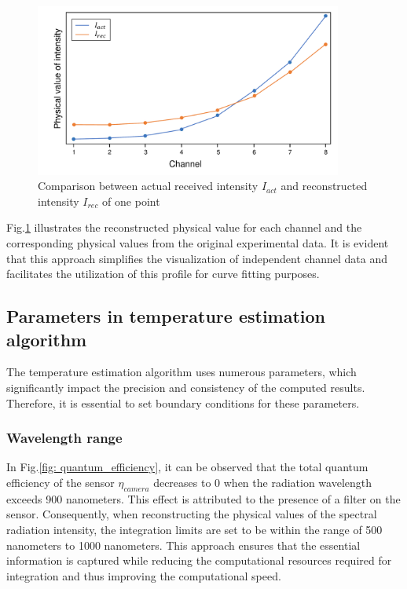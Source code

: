 \begin{figure}[htbp]
  \centering
  \includegraphics[width=0.9\textwidth]{figures/curve_fit.pdf}
  \caption{Comparison between actual received intensity $I_{act}$ 
  and reconstructed intensity $I_{rec}$ of one point}
  \label{fig: curve_fit_demo}
\end{figure}


Fig.\ref{fig: curve_fit_demo} illustrates the reconstructed physical 
value for each channel and the corresponding physical values from the 
original experimental data. It is evident that this approach simplifies 
the visualization of independent channel data and facilitates the 
utilization of this profile for curve fitting purposes.


\subsection{Parameters in temperature estimation algorithm}
The temperature estimation algorithm uses numerous parameters, 
which significantly impact the precision and consistency of the 
computed results. Therefore, it is essential to set boundary conditions 
for these parameters.


\subsubsection{Wavelength range}
In Fig.\ref{fig: quantum_efficiency}, it can be observed that the 
total quantum efficiency of the sensor $\eta_{camera}$ decreases to 
0 when the radiation wavelength exceeds 900 nanometers. This effect is 
attributed to the presence of a filter on the sensor. Consequently, 
when reconstructing the physical values of the spectral radiation 
intensity, the integration limits are set to be within the 
range of 500 nanometers to 1000 nanometers. This approach ensures 
that the essential information is captured while reducing the 
computational resources required for integration and thus improving the 
computational speed.


